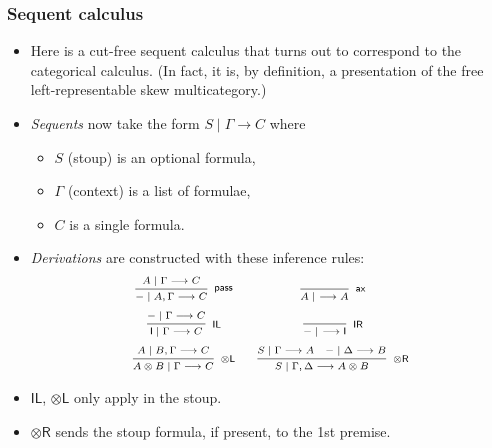 \documentclass[10pt,t]{beamer}
\newcommand{\I}{\mathsf{I}}
\newcommand{\ot}{\otimes}
\newcommand{\n}{{-}}
\newcommand{\ax}{\mathsf{ax}}
\newcommand{\uf}{\mathsf{pass}}
\newcommand{\IL}{\I\mathsf{L}}
\newcommand{\otL}{\ot\mathsf{L}}
\newcommand{\IR}{\I\mathsf{R}}
\newcommand{\otR}{\ot\mathsf{R}}
\newcommand{\scut}{\mathsf{scut}}
\newcommand{\ccut}{\mathsf{ccut}}
\renewcommand{\vdash}{\longrightarrow}
\begin{document}
\begin{frame}

\frametitle{Sequent calculus}

\begin{itemize}

\item Here is a cut-free sequent calculus that turns out to correspond
  to the categorical calculus. (In fact, it is, by definition, a
  presentation of the free left-representable skew multicategory.)

\medskip

\item \emph{Sequents} now take the form $S \mid \Gamma \vdash C$
  where
\begin{itemize}
\item $S$ (stoup) is an optional formula,
\item $\Gamma$ (context) is a list of formulae,
\item $C$ is a single formula.
\end{itemize}

\item \emph{Derivations} are constructed with these inference rules:
\[
\scriptsize
\begin{array}{c@{\quad \quad}c}
\infer[\uf]{\n \mid A, \Gamma \vdash C}{
  A \mid \Gamma \vdash C
}
&
\infer[\ax]{A \mid ~\vdash A}{
}
\\[6pt]
\infer[\IL]{\I \mid \Gamma \vdash C}{
  \n \mid \Gamma \vdash C
}
&
\infer[\IR]{\n \mid ~ \vdash \I}{
}
\\[6pt]
\infer[\otL]{A \ot B \mid \Gamma \vdash C}{
  A \mid B, \Gamma \vdash C
}
&
\infer[\otR]{S \mid \Gamma, \Delta \vdash A \otimes B}{
  S \mid \Gamma \vdash A
  &
  \n \mid \Delta \vdash B
}
\end{array}
\]

\item $\IL$, $\otL$ only apply in the stoup.
\item $\otR$ sends the stoup formula, if present, to the
  1st premise.


\end{itemize}


\end{frame}
\end{document}
